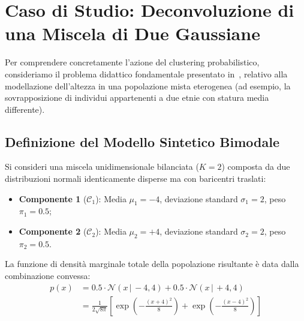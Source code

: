 \FloatBarrier
\section{Caso di Studio: Deconvoluzione di una Miscela di Due Gaussiane}
\label{sec:dm-case-study-two-gaussians}

Per comprendere concretamente l'azione del clustering probabilistico, consideriamo il problema didattico fondamentale presentato in~\cite{tan2018}, relativo alla modellazione dell'altezza in una popolazione mista eterogenea (ad esempio, la sovrapposizione di individui appartenenti a due etnie con statura media differente).

\FloatBarrier
\subsection{Definizione del Modello Sintetico Bimodale}

Si consideri una miscela unidimensionale bilanciata ($K=2$) composta da due distribuzioni normali identicamente disperse ma con baricentri traslati:
\begin{itemize}
    \item \textbf{Componente 1} ($\mathcal{C}_1$): Media $\mu_1 = -4$, deviazione standard $\sigma_1 = 2$, peso $\pi_1 = 0.5$;
    \item \textbf{Componente 2} ($\mathcal{C}_2$): Media $\mu_2 = +4$, deviazione standard $\sigma_2 = 2$, peso $\pi_2 = 0.5$.
\end{itemize}
La funzione di densità marginale totale della popolazione risultante è data dalla combinazione convessa:
\begin{align}
\label{eq:dm-two-gaussian-pdf}
p(x) &= 0.5 \cdot \mathcal{N}(x \,|\, -4, 4) + 0.5 \cdot \mathcal{N}(x \,|\, +4, 4) \nonumber \\
&= \frac{1}{2\sqrt{8\pi}} \left[ \exp\left( -\frac{(x+4)^2}{8} \right) + \exp\left( -\frac{(x-4)^2}{8} \right) \right]
\end{align}

